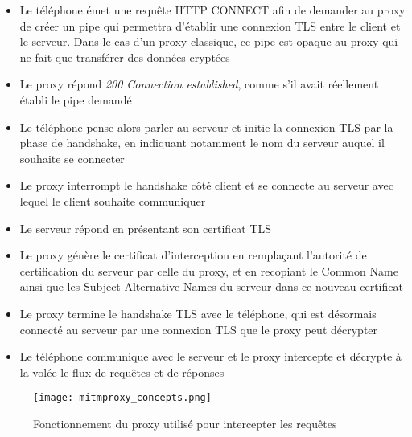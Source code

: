 \documentclass[runningheads]{llncs}
\begin{document}
\begin{itemize}
    \item Le téléphone émet une requête HTTP CONNECT afin de demander au proxy de créer un pipe qui permettra d'établir une connexion TLS entre le client et le serveur. Dans le cas d'un proxy classique, ce pipe est opaque au proxy qui ne fait que transférer des données cryptées
    \item Le proxy répond \textit{200 Connection established}, comme s'il avait réellement établi le pipe demandé
    \item Le téléphone pense alors parler au serveur et initie la connexion TLS par la phase de handshake, en indiquant notamment le nom du serveur auquel il souhaite se connecter
    \item Le proxy interrompt le handshake côté client et se connecte au serveur avec lequel le client souhaite communiquer
    \item Le serveur répond en présentant son certificat TLS
    \item Le proxy génère le certificat d'interception en remplaçant l'autorité de certification du serveur par celle du proxy, et en recopiant le Common Name ainsi que les Subject Alternative Names du serveur dans ce nouveau certificat
    \item Le proxy termine le handshake TLS avec le téléphone, qui est désormais connecté au serveur par une connexion TLS que le proxy peut décrypter
    \item Le téléphone communique avec le serveur et le proxy intercepte et décrypte à la volée le flux de requêtes et de réponses
\end{itemize}

\begin{figure}
    \centering
    \texttt{[image: mitmproxy\_concepts.png]}
    \caption{Fonctionnement du proxy utilisé pour intercepter les requêtes}
    \label{fig:mitmproxy/concepts}
\end{figure}
\end{document}
